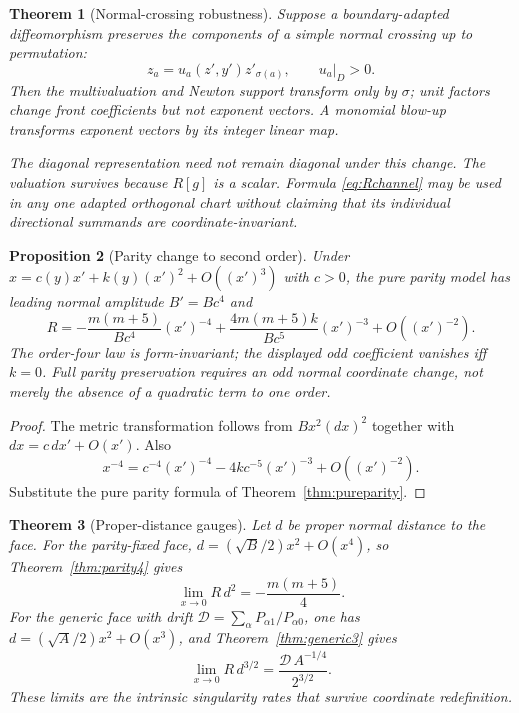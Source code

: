 \documentclass[11pt,a4paper]{article}
\newtheorem{theorem}{Theorem}[section]
\newtheorem{proposition}[theorem]{Proposition}
\theoremstyle{definition}
\theoremstyle{remark}
\begin{document}
\begin{theorem}[Normal-crossing robustness]
\label{thm:ncrobust}
Suppose a boundary-adapted diffeomorphism preserves the components of a simple
normal crossing up to permutation:
\[
z_a=u_a(z',y')z'_{\sigma(a)},
\qquad
u_a|_D>0.
\]
Then the multivaluation and Newton support transform only by \(\sigma\); unit
factors change front coefficients but not exponent vectors. A monomial blow-up
transforms exponent vectors by its integer linear map.

The diagonal representation need not remain diagonal under this change. The
valuation survives because \(R[g]\) is a scalar. Formula \eqref{eq:Rchannel}
may be used in any one adapted orthogonal chart without claiming that its
individual directional summands are coordinate-invariant.
\end{theorem}

\begin{proposition}[Parity change to second order]
\label{prop:paritychange}
Under \(x=c(y)x'+k(y)(x')^2+O((x')^3)\) with \(c>0\), the pure parity model has
leading normal amplitude \(B'=Bc^4\) and
\begin{equation}
R
=
-\frac{m(m+5)}{Bc^4}(x')^{-4}
+\frac{4m(m+5)k}{Bc^5}(x')^{-3}
+O((x')^{-2}).
\label{eq:paritychange}
\end{equation}
The order-four law is form-invariant; the displayed odd coefficient vanishes
iff \(k=0\). Full parity preservation requires an odd normal coordinate change,
not merely the absence of a quadratic term to one order.
\end{proposition}

\begin{proof}
The metric transformation follows from \(Bx^2(dx)^2\) together with
\(dx=c\,dx'+O(x')\). Also
\[
x^{-4}
=
c^{-4}(x')^{-4}
-4kc^{-5}(x')^{-3}
+O((x')^{-2}).
\]
Substitute the pure parity formula of Theorem~\ref{thm:pureparity}.
\end{proof}

\begin{theorem}[Proper-distance gauges]
\label{thm:proper}
Let \(d\) be proper normal distance to the face. For the parity-fixed face,
\(d=(\sqrt B/2)x^2+O(x^4)\), so Theorem~\ref{thm:parity4} gives
\begin{equation}
\boxed{\lim_{x\to0}R\,d^2=-\frac{m(m+5)}{4}.}
\label{eq:Rd2}
\end{equation}
For the generic face with drift
\(\mathcal D=\sum_\alpha P_{\alpha1}/P_{\alpha0}\), one has
\(d=(\sqrt A/2)x^2+O(x^3)\), and Theorem~\ref{thm:generic3} gives
\begin{equation}
\boxed{
\lim_{x\to0}R\,d^{3/2}
=
\frac{\mathcal D\,A^{-1/4}}{2^{3/2}}.
}
\label{eq:Rd32}
\end{equation}
These limits are the intrinsic singularity rates that survive coordinate
redefinition.
\end{theorem}
\end{document}
